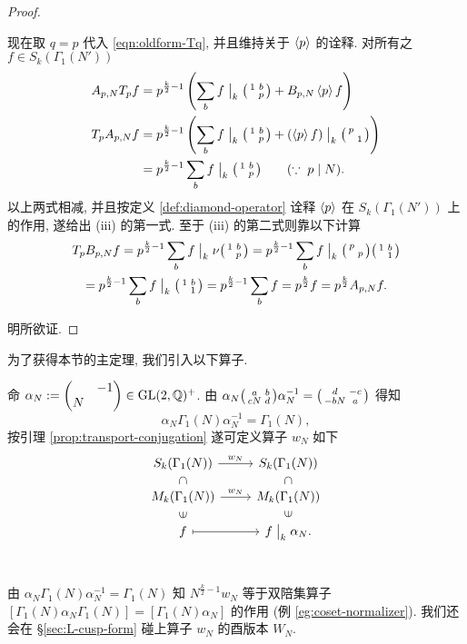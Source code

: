 \begin{proof}
\begin{asparaenum}[(a)]
		\item 现在取 $q = p$ 代入 \eqref{eqn:oldform-Tq}, 并且维持关于 $\left\langle p \right\rangle$ 的诠释. 对所有之 $f \in S_k(\Gamma_1(N'))$
		\begin{align*}
			A_{p,N} T_p f & = p^{\frac{k}{2} - 1} \left( \sum_b f \;\big|_{k} \; \bigl(\begin{smallmatrix} 1 & b \\  & p \end{smallmatrix}\bigr) + B_{p,N} \left\langle p \right\rangle f \right) \\
			T_p A_{p,N} f & = p^{\frac{k}{2} - 1} \left( \sum_b f \;\big|_{k} \; \bigl(\begin{smallmatrix} 1 & b \\  & p \end{smallmatrix}\bigr) + (\left\langle p \right\rangle f) \;\big|_{k} \; \bigl(\begin{smallmatrix} p &  \\  & 1 \end{smallmatrix}\bigr) \right) \\
			& = p^{\frac{k}{2} - 1} \sum_b f \;\big|_{k} \; \bigl(\begin{smallmatrix} 1 & b \\  & p \end{smallmatrix}\bigr) \qquad (\because \; p \mid N).
		\end{align*}
		以上两式相减, 并且按定义 \ref{def:diamond-operator} 诠释 $\left\langle p \right\rangle$ 在 $S_k(\Gamma_1(N'))$ 上的作用, 遂给出 (iii) 的第一式. 至于 (iii) 的第二式则靠以下计算
		\begin{multline*}
			T_p B_{p,N} f = p^{\frac{k}{2} - 1} \sum_b f \;\big|_{k} \; \nu \bigl(\begin{smallmatrix} 1 & b \\  & p \end{smallmatrix}\bigr) = p^{\frac{k}{2} - 1} \sum_b f \;\big|_{k} \; \bigl(\begin{smallmatrix} p &  \\  & p \end{smallmatrix}\bigr) \bigl(\begin{smallmatrix} 1 & b \\  & 1 \end{smallmatrix}\bigr) \\
			= p^{\frac{k}{2} - 1} \sum_b f \;\big|_{k} \; \bigl(\begin{smallmatrix} 1 & b \\  & 1 \end{smallmatrix}\bigr) = p^{\frac{k}{2} - 1} \sum_b f = p^{\frac{k}{2}} f = p^{\frac{k}{2}} A_{p,N}f.
		\end{multline*}
	\end{asparaenum}
	明所欲证.
\end{proof}

为了获得本节的主定理, 我们引入以下算子.
\begin{definition}\label{def:w_N} 
	命 $\alpha_N := \begin{pmatrix}  & -1 \\ N &  \end{pmatrix} \in \operatorname{GL}(2,\mathbb{Q})^+$. 由 $\alpha_N \bigl(\begin{smallmatrix} a & b \\ cN & d \end{smallmatrix}\bigr) \alpha_N^{-1} = \bigl(\begin{smallmatrix} d & -c \\ -bN & a \end{smallmatrix}\bigr)$ 得知
	\[ \alpha_N \Gamma_1(N) \alpha_N^{-1} = \Gamma_1(N), \]
	按引理 \ref{prop:transport-conjugation} 遂可定义算子 $w_N$ 如下
	\[\begin{tikzcd}[row sep=small]
		S_k(\Gamma_1(N)) \arrow[r, "w_N"] \arrow[phantom, d, "\subset" description, sloped] & S_k(\Gamma_1(N)) \arrow[phantom, d, "\subset" description, sloped] \\
		M_k(\Gamma_1(N)) \arrow[r, "w_N"] & M_k(\Gamma_1(N)) \\
		f \arrow[r, mapsto] \arrow[phantom, u, "\in" description, sloped] & f \modact{k} \alpha_N . \arrow[phantom, u, "\in" description, sloped]
	\end{tikzcd}\]\
\end{definition}

由 $\alpha_N \Gamma_1(N) \alpha_N^{-1} = \Gamma_1(N)$ 知 $N^{\frac{k}{2} - 1} w_N$ 等于双陪集算子 $[\Gamma_1(N) \alpha_N \Gamma_1(N)] = [\Gamma_1(N) \alpha_N]$ 的作用 (例 \ref{eg:coset-normalizer}). 我们还会在 \S\ref{sec:L-cusp-form} 碰上算子 $w_N$ 的酉版本 $W_N$.

